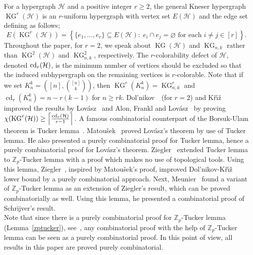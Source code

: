 \documentclass[11pt]{amsart}
\theoremstyle{definition}
\theoremstyle{remark}
\def\Z{\mathbb{Z}}
\def\KG{\operatorname{KG}}
\def\cd{\operatorname{cd}}
\begin{document}
For a hypergraph $\mathcal{H}$ and a positive integer $r\geq 2$, the general Kneser 
hypergraph $\KG^r(\mathcal{H})$ is an $r$-uniform hypergraph with vertex 
set $E(\mathcal{H})$ 
and the edge set defining as follows;
$$E(\KG^r(\mathcal{H}))=\left\{\{e_1,\ldots,e_r\}\subseteq E(\mathcal{H}):\; 
e_i\cap e_j=\varnothing\mbox{ for each } i\neq j\in[r]\right\}.$$ 
Throughout the paper, for $r=2$, we speak about $\KG(\mathcal{H})$ and $\KG_{n,k}$
rather than $\KG^2(\mathcal{H})$ and $\KG^2_{n,k}$, respectively. The $r$-colorability defect of ${\mathcal H}$, denoted ${\rm cd}_r({\mathcal H})$, is the 
minimum number of vertices should be excluded so that the induced subhypergraph on the remaining vertices is $r$-colorable.
Note that if we set $K_n^k=([n],{[n]\choose k})$, then $\KG^r(K_n^k)=\KG^r_{n,k}$ 
and $\cd_r(K_n^k)=n-r(k-1)$ for $n\geq rk$. 
Dol'nikov~\cite{MR953021}~(for $r=2$) and K{\v{r}}{\'{\i}}{\v{z}}~{\rm \cite{MR1081939} }improved  the results by Lov\'asz~\cite{MR514625} and  Alon, Frankl and 
Lov\'asz~\cite{MR857448} by proving 
$\chi(\KG^r(\mathcal{H}))\geq\left\lceil{\cd_r(\mathcal{H})\over r-1}\right\rceil.$ 
A famous combinatorial counterpart of the Borsuk-Ulam theorem is Tucker lemma~\cite{MR0020254}.
Matou{\v{s}}ek~\cite{MR2057690} proved Lov\'asz's theorem by use of Tucker lemma.
He also presented a purely combinatorial proof for 
Tucker lemma, hence a purely combinatorial proof 
for Lov\'asz's theorem. 
Ziegler~\cite{MR1893009} extended Tucker lemma to $\Z_p$-Tucker lemma with a proof which makes no use of topological tools.
Using this lemma, Ziegler~\cite{MR1893009}, inspired by Matou{\v{s}}ek's proof,  improved 
Dol'nikov-K{\v{r}}{\'{\i}}{\v{z}} lower bound by a purely combinatorial approach. 
Next, Meunier~\cite{MR2793613} found a variant of  $\Z_p$-Tucker lemma as an 
extension of Ziegler's result, which can be proved combinatorially as well. Using this lemma, he presented a combinatorial proof of Schrijver's result.\\


 Note that since there is a purely combinatorial proof for $\Z_p$-Tucker 
lemma (Lemma~\ref{zptucker}), see~\cite{MR2793613,MR1893009}, 
any combinatorial proof with the help 
of $\Z_p$-Tucker lemma can be seen as a purely combinatorial proof. 
In this point of view, all results in this paper are proved purely combinatorial. \\
\end{document}
